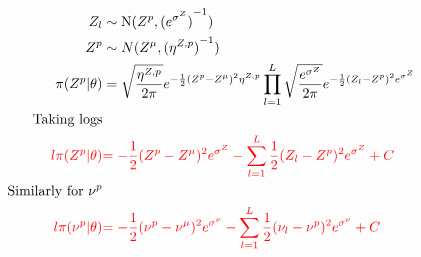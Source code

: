 \begin{align*}
Z_{l} &\sim \operatorname{N}(Z^{p},{(e^{\sigma^{Z}})}^{-1})\\
Z^{p} &\sim N(Z^{\mu},{(\eta^{Z,p})}^{-1}) \\
\pi(Z^{p}|\theta)&=\sqrt{\frac{\eta^{Z,p}}{2\pi}} e^{-\frac{1}{2}(Z^{p}-Z^{\mu})^{2}\eta^{Z,p} }
\prod_{l=1}^{L}\sqrt{\frac{e^{\sigma^{Z}}}{2\pi}} e^{-\frac{1}{2}(Z_{l}-Z^{p})^{2}e^{\sigma^{Z}} }\\
\text{Taking logs}\\
\color{red}{l\pi(Z^{p}|\theta)}&
\color{red}{
=-\frac{1}{2}(Z^{p}-Z^{\mu})^{2}e^{\sigma^{Z}}
-
\sum_{l=1}^{L}\frac{1}{2}(Z_{l}-Z^{p})^{2}e^{\sigma^{Z}}
+C
}\\
\text{Similarly for $\nu^p$}\\
\color{red}{l\pi(\nu^p|\theta)}&
\color{red}{
=-\frac{1}{2}(\nu^{p}-\nu^{\mu})^{2}e^{\sigma^{\nu}}
-
\sum_{l=1}^{L}\frac{1}{2}(\nu_{l}-\nu^{p})^{2}e^{\sigma^{\nu}}
+C
}
\end{align*}
